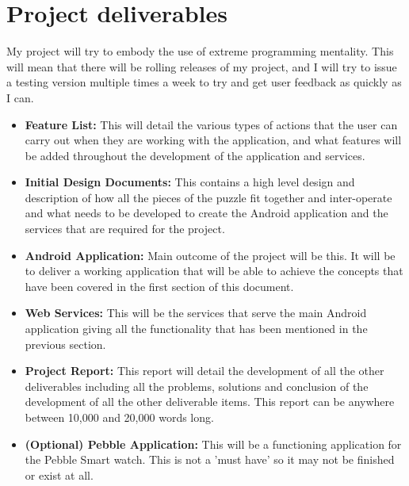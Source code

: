 \documentclass[11pt,fleqn,twoside]{article}
\begin{document}


\section{Project deliverables}

My project will try to embody the use of extreme programming mentality. This will mean that there will be rolling releases of my project, and I will try to issue a testing version multiple times a week to try and get user feedback as quickly as I can.

\begin{itemize}
\item \textbf{Feature List:} This will detail the various types of actions that the user can carry out when they are working with the application, and what features will be added throughout the development of the application and services.

\item \textbf{Initial Design Documents:} This contains a high level design and description of how all the pieces of the puzzle fit together and inter-operate and what needs to be developed to create the Android application and the services that are required for the project.

\item \textbf{Android Application:} Main outcome of the project will be this. It will be to deliver a working application that will be able to achieve the concepts that have been covered in the first section of this document.

\item \textbf{Web Services:} This will be the services that serve the main Android application giving all the functionality that has been mentioned in the previous section.

\item \textbf{Project Report:} This report will detail the development of all the other deliverables including all the problems, solutions and conclusion of the development of all the other deliverable items. This report can be anywhere between 10,000 and 20,000 words long.

\item \textbf{(Optional) Pebble Application:} This will be a functioning application for the Pebble Smart watch. This is not a 'must have' so it may not be finished or exist at all.

\end{itemize}
\end{document}
